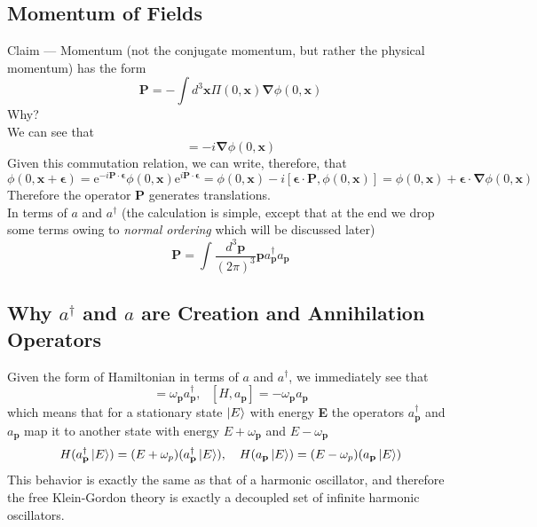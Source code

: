 \documentclass[11pt]{article}
\newcommand{\e}{\mathrm{e}}
\newcommand{\w}{\omega}
\numberwithin{equation}{section}
\begin{document}
    \subsection{Momentum of Fields}
    Claim — Momentum (not the conjugate momentum, but rather the physical momentum) has the form 
    \begin{equation}
        \textbf{P} = -\int d^3\textbf{x}\Pi(0, \textbf{x}) \mathbf{\nabla} \phi(0, \textbf{x}) 
    \end{equation}
    Why?\\
    We can see that  
    \begin{equation*}
        [\textbf{P}, \phi(0, \textbf{x})] = -i\mathbf{\nabla}\phi(0, \textbf{x})
    \end{equation*}
    Given this commutation relation, we can write, therefore, that 
    \begin{equation}
        \phi(0, \textbf{x} + \mathbf{\epsilon}) = \e^{-i\textbf{P}\cdot\mathbf{\epsilon}}\phi(0, \textbf{x})\e^{i\textbf{P}\cdot\mathbf{\epsilon}} = \phi(0, \textbf{x}) - i[\mathbf{\epsilon}\cdot\textbf{P}, \phi(0, \textbf{x})] = \phi(0, \textbf{x}) + \mathbf{\epsilon}\cdot \mathbf{\nabla}\phi(0, \textbf{x})
    \end{equation}
    Therefore the operator \(\textbf{P}\) generates translations.\\

    In terms of \(a\) and \(a^\dagger\) (the calculation is simple, except that at the end we drop some terms owing to \textit{normal ordering} which will be discussed later) 
    \begin{equation}
        \textbf{P} = \int \frac{d^3\textbf{p}}{(2\pi)^3} \textbf{p}a^\dagger_\textbf{p} a_\textbf{p}
    \end{equation}

    \subsection{Why \(a^\dagger\) and \(a\) are Creation and Annihilation Operators}
    Given the form of Hamiltonian in terms of \(a\) and \(a^\dagger\), we immediately see that 
    \begin{equation}
        [H, a^\dagger_\textbf{p}] = \w_\textbf{p}a^\dagger_\textbf{p},~~~[H, a_\textbf{p}] = -\w_\textbf{p}a_\textbf{p}
    \end{equation}
    which means that for a stationary state \(\ket{E}\) with energy \textbf{E} the operators \(a^\dagger_\textbf{p}\) and \(a_\textbf{p}\) map it to another state with energy \(E+\w_\textbf{p}\) and \(E-\w_\textbf{p}\)
    \begin{equation}
        H(a^\dagger_\textbf{p}\ket{E}) = (E + \omega_p)(a^\dagger_\textbf{p}\ket{E}),~~~ H(a_\textbf{p}\ket{E}) = (E - \omega_p)(a_\textbf{p}\ket{E})
    \end{equation}
    This behavior is exactly the same as that of a harmonic oscillator, and therefore the free Klein-Gordon theory is exactly a decoupled set of infinite harmonic oscillators. 
\end{document}
